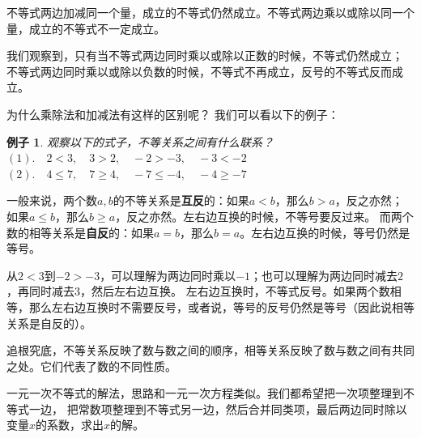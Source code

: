\documentclass[12pt,UTF8]{ctexbook}
\newtheorem{ex}{例子}[section]
\begin{document}
不等式两边加减同一个量，成立的不等式仍然成立。不等式两边乘以或除以同一个量，成立的不等式不一定成立。

我们观察到，只有当不等式两边同时乘以或除以正数的时候，不等式仍然成立；
不等式两边同时乘以或除以负数的时候，不等式不再成立，反号的不等式反而成立。

为什么乘除法和加减法有这样的区别呢？
我们可以看以下的例子：
\begin{ex}\label{ex:4-1-20}
    观察以下的式子，不等关系之间有什么联系？\\
    $(1).\quad 2 < 3, \quad 3 > 2, \quad -2 > -3, \quad -3 < -2$ \\
    $(2). \quad 4 \leqslant 7, \quad 7 \geqslant 4, \quad -7 \leqslant -4, \quad -4 \geqslant -7$
\end{ex}
一般来说，两个数$a,b$的不等关系是\textbf{互反}的：如果$a < b$，那么$b > a$，反之亦然；
如果$a \leqslant b$，那么$b \geqslant a$，反之亦然。左右边互换的时候，不等号要反过来。
而两个数的相等关系是\textbf{自反}的：如果$a = b$，那么$b = a$。左右边互换的时候，等号仍然是等号。

从$2 < 3$到$-2 > -3$，可以理解为两边同时乘以$-1$；也可以理解为两边同时减去$2$，再同时减去$3$，然后左右边互换。
左右边互换时，不等式反号。如果两个数相等，那么左右边互换时不需要反号，或者说，等号的反号仍然是等号（因此说相等关系是自反的）。

追根究底，不等关系反映了数与数之间的顺序，相等关系反映了数与数之间有共同之处。它们代表了数的不同性质。

一元一次不等式的解法，思路和一元一次方程类似。我们都希望把一次项整理到不等式一边，
把常数项整理到不等式另一边，然后合并同类项，最后两边同时除以变量$x$的系数，求出$x$的解。
\end{document}
